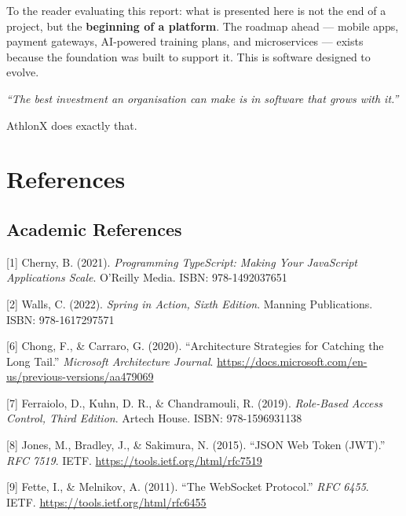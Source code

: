 \documentclass[
  12pt,
  a4paperpaper,
]{report}
\begin{document}
\vspace{0.15cm}

\noindent
To the reader evaluating this report: what is presented here is not the end of a project, but the \textbf{beginning of a platform}. The roadmap ahead --- mobile apps, payment gateways, AI-powered training plans, and microservices --- exists because the foundation was built to support it. This is software designed to evolve.

\vspace{0.15cm}

\begin{center}
\textit{``The best investment an organisation can make is in software that grows with it.''}
\end{center}

\vspace{0.3cm}

\noindent
AthlonX does exactly that.




\chapter{References}\label{references}

\section{Academic References}\label{academic-references}

{[}1{]} Cherny, B. (2021). \emph{Programming TypeScript: Making Your
JavaScript Applications Scale}. O'Reilly Media. ISBN: 978-1492037651

{[}2{]} Walls, C. (2022). \emph{Spring in Action, Sixth Edition}.
Manning Publications. ISBN: 978-1617297571

{[}6{]} Chong, F., \& Carraro, G. (2020). ``Architecture Strategies for
Catching the Long Tail.'' \emph{Microsoft Architecture Journal}.
\url{https://docs.microsoft.com/en-us/previous-versions/aa479069}

{[}7{]} Ferraiolo, D., Kuhn, D. R., \& Chandramouli, R. (2019).
\emph{Role-Based Access Control, Third Edition}. Artech House. ISBN:
978-1596931138

{[}8{]} Jones, M., Bradley, J., \& Sakimura, N. (2015). ``JSON Web Token
(JWT).'' \emph{RFC 7519}. IETF. \url{https://tools.ietf.org/html/rfc7519}

{[}9{]} Fette, I., \& Melnikov, A. (2011). ``The WebSocket Protocol.''
\emph{RFC 6455}. IETF. \url{https://tools.ietf.org/html/rfc6455}
\end{document}

